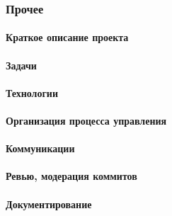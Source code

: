 \documentclass[a5paper]{article}
\begin{document}
\subsubsection{Прочее}

\paragraph{Краткое описание проекта}

\paragraph{Задачи}

\paragraph{Технологии}

\paragraph{Организация процесса управления}

\paragraph{Коммуникации}

\paragraph{Ревью, модерация коммитов}

\paragraph{Документирование}
\end{document}
